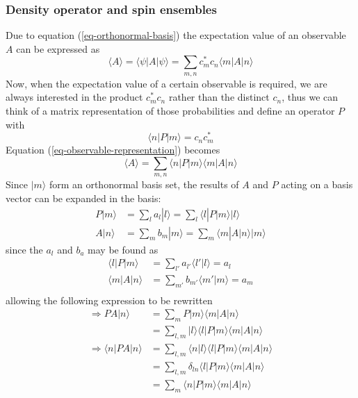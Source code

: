 \documentclass[11.5pt,a4paper]{article}
\begin{document}
\subsubsection{Density operator and spin ensembles}
Due to equation (\ref{eq-orthonormal-basis}) the expectation value of an observable $A$ can be expressed as 
\begin{equation}
 \langle A \rangle = \langle \psi | A | \psi \rangle = \sum_{m,n} c_m^* c_n \langle m | A | n \rangle
  \label{eq-observable-representation}
\end{equation}
Now, when the expectation value of a certain observable is required, we are always interested in the product $c_m^* c_n$ rather than the distinct $c_n$, thus we can think of a matrix representation of those probabilities and define an operator $P$ with
\begin{equation}
 \langle n | P | m \rangle = c_n c_m^*
\end{equation}
Equation (\ref{eq-observable-representation}) becomes
\begin{equation}
 \langle A \rangle = \sum_{m,n} \langle n | P | m \rangle \langle m | A | n \rangle
  \label{eq-P-A-representation}
\end{equation}
Since $|m\rangle$ form an orthonormal basis set, the results of $A$ and $P$ acting on a basis vector can be expanded in the basis:
\begin{align} 
 P|m\rangle & = \sum_l a_l |l\rangle = \sum_l \langle l |P|m\rangle |l\rangle\\
 A|n\rangle & = \sum_m b_m |m\rangle = \sum_m \langle m |A|n\rangle |m\rangle 
\end{align}
since the $a_l$ and $b_a$ may be found as
\begin{align}
  \langle l |P|m\rangle & = \sum_{l'} a_{l'} \langle l'|l\rangle = a_l\\
  \langle m |A|n\rangle & = \sum_{m'} b_{m'} \langle m'|m\rangle = a_m\\
\end{align}
allowing the following expression to be rewritten
\begin{align}
 \Rightarrow P A |n\rangle & = \sum_m P|m\rangle \langle m | A | n \rangle \\
  & = \sum_{l,m} |l\rangle \langle l | P | m \rangle \langle m | A | n \rangle \\
  \Rightarrow \langle n | P A | n \rangle & = \sum_{l,m} \langle n|l\rangle \langle l | P | m \rangle \langle m | A | n \rangle \\
  & = \sum_{l,m} \delta_{ln} \langle l | P | m \rangle \langle m | A | n \rangle \\
  & = \sum_{m} \langle n | P | m \rangle \langle m | A | n \rangle
\end{align}
\end{document}
